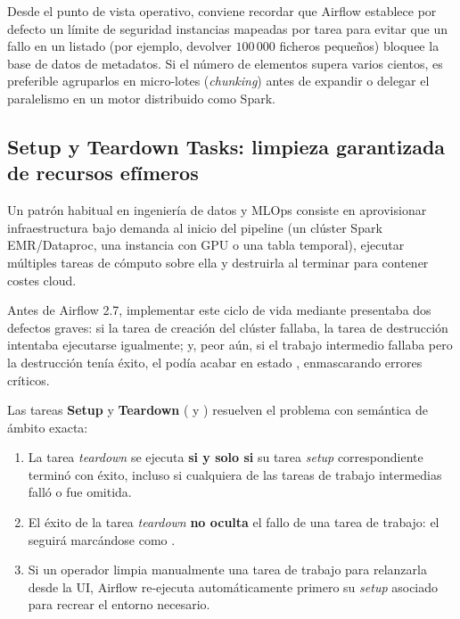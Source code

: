 Desde el punto de vista operativo, conviene recordar que Airflow establece por defecto un límite de seguridad  instancias mapeadas por tarea para evitar que un fallo en un listado (por ejemplo, devolver $100\,000$ ficheros pequeños) bloquee la base de datos de metadatos. Si el número de elementos supera varios cientos, es preferible agruparlos en micro-lotes (\textit{chunking}) antes de expandir o delegar el paralelismo en un motor distribuido como Spark.

\subsection{Setup y Teardown Tasks: limpieza garantizada de recursos efímeros}

Un patrón habitual en ingeniería de datos y MLOps consiste en aprovisionar infraestructura bajo demanda al inicio del pipeline (un clúster Spark EMR/Dataproc, una instancia con GPU o una tabla temporal), ejecutar múltiples tareas de cómputo sobre ella y destruirla al terminar para contener costes cloud.

Antes de Airflow 2.7, implementar este ciclo de vida mediante  presentaba dos defectos graves: si la tarea de creación del clúster fallaba, la tarea de destrucción intentaba ejecutarse igualmente; y, peor aún, si el trabajo intermedio fallaba pero la destrucción tenía éxito, el  podía acabar en estado , enmascarando errores críticos.

Las tareas \textbf{Setup} y \textbf{Teardown} ( y ) resuelven el problema con semántica de ámbito exacta:
\begin{enumerate}
  \item La tarea \textit{teardown} se ejecuta \textbf{si y solo si} su tarea \textit{setup} correspondiente terminó con éxito, incluso si cualquiera de las tareas de trabajo intermedias falló o fue omitida.
  \item El éxito de la tarea \textit{teardown} \textbf{no oculta} el fallo de una tarea de trabajo: el  seguirá marcándose como .
  \item Si un operador limpia manualmente una tarea de trabajo para relanzarla desde la UI, Airflow re-ejecuta automáticamente primero su \textit{setup} asociado para recrear el entorno necesario.
\end{enumerate}

